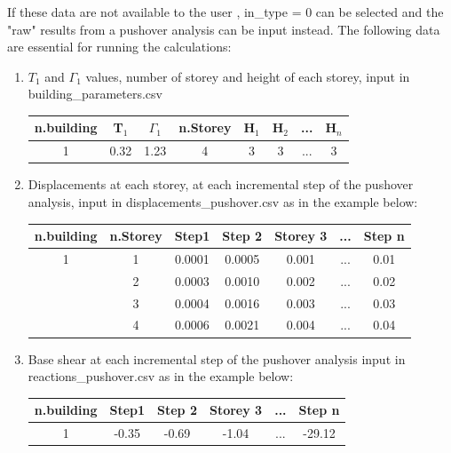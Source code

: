 If these data are not available to the user , in\_type = 0 can be selected and the "raw" results from a pushover analysis can be input instead. The following data are essential for running the calculations:

\begin{enumerate}
\item $T_1$ and $\Gamma_1$ values, number of storey and height of each storey, input in building\_parameters.csv
	\begin{table}[H]
	\centering
	\begin{tabular}{|c|c|c|c|c|c|c|c|} \hline
	\textbf{n.building} & \textbf{T$_1$} & \textbf{$\Gamma_1$} & \textbf{n.Storey} & \textbf{H$_1$} & \textbf{H$_2$} & ... & \textbf{H$_n$} \\ \hline
	1 & 0.32 & 1.23 & 4 & 3 & 3 & ... & 3 \\ \hline
	\end{tabular}
	\end{table}
	
\item Displacements at each storey, at each incremental step of the pushover analysis, input in displacements\_pushover.csv as in the example below: 
	\begin{table}[H]
	\centering
	\begin{tabular}{|c|c|c|c|c|c|c|} \hline
	\textbf{n.building} & \textbf{n.Storey} & \textbf{Step1} & \textbf{Step 2} & \textbf{Storey 3} & ... & \textbf{Step n}\\ \hline
	1 &	1 & 0.0001 &	0.0005 &	0.001 & ... & 0.01\\ \hline
	   &	2 & 0.0003 &	0.0010 &	0.002 & ... & 0.02\\ \hline
	   &	3 & 0.0004 &	0.0016 &	0.003 & ... & 0.03\\ \hline
	   &	4 & 0.0006 &	0.0021 &	0.004 & ... & 0.04\\ \hline
	\end{tabular}
	\end{table}
	
\item Base shear at each incremental step of the pushover analysis input in reactions\_pushover.csv as in the example below:
	\begin{table}[H]
	\centering
	\begin{tabular}{|c|c|c|c|c|c|} \hline
	\textbf{n.building} &	\textbf{Step1} & \textbf{Step 2} & \textbf{Storey 3} & ... & \textbf{Step n} \\ \hline
	1 & -0.35 & -0.69 & -1.04 & ... & -29.12\\ \hline
	\end{tabular}
	\end{table}
	

\end{enumerate}
